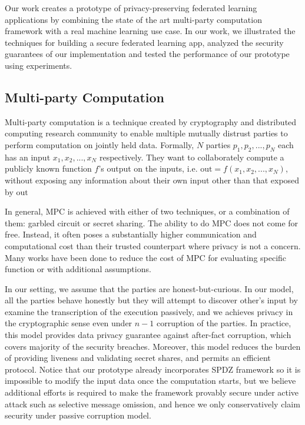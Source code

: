 \documentclass[a4paper,12pt]{article}
\begin{document}
Our work creates a prototype of privacy-preserving federated learning applications by combining the state of the art multi-party computation framework with a real machine learning use case. In our work, we illustrated the techniques for building a secure federated learning app, analyzed the security guarantees of our implementation and tested the performance of our prototype using experiments.

\subsection{Multi-party Computation}
Multi-party computation is a technique created by cryptography and distributed computing research community to enable multiple mutually distrust parties to perform computation on jointly held data. Formally, $N$ parties $p_1, p_2, ..., p_N$ each has an input $x_1, x_2, ..., x_N$ respectively. They want to collaborately compute a publicly known function $f$'s output on the inputs, i.e. $\text{out}=f(x_1, x_2, ..., x_N)$, without exposing any information about their own input other than that exposed by $\text{out}$ 

In general, MPC is achieved with either of two techniques, or a combination of them: garbled circuit or secret sharing. The ability to do MPC does not come for free. Instead, it often poses a substantially higher communication and computational cost than their trusted counterpart where privacy is not a concern. Many works have been done to reduce the cost of MPC for evaluating specific function or with additional assumptions. 

In our setting, we assume that the parties are honest-but-curious. In our model, all the parties behave honestly but they will attempt to discover other's input by examine the transcription of the execution passively, and we achieves privacy in the cryptographic sense even under $n-1$ corruption of the parties. In practice, this model provides data privacy guarantee against after-fact corruption, which covers majority of the security breaches. Moreover, this model reduces the burden of providing liveness and validating secret shares, and permits an efficient protocol. Notice that our prototype already incorporates SPDZ framework so it is impossible to modify the input data once the computation starts, but we believe additional efforts is required to make the framework provably secure under active attack such as selective message omission, and hence we only conservatively claim security under passive corruption model.
\end{document}
